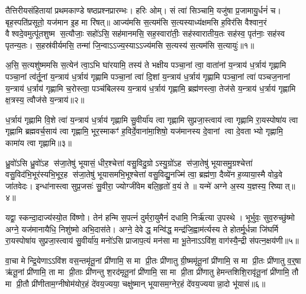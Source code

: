 {}

\setcounter{anuvakam}{0}
तैत्तिरीयसंहितायां प्रथमकाण्डे षष्ठप्रश्नप्रारम्भः। हरिः ओम्। सं त्वा॑ सिञ्चामि॒ यजु॑षा प्र॒जामायु॒र्धनं॑ च। बृह॒स्पति॑प्रसूतो॒ यज॑मान इ॒ह मा रि॑षत्॥ आज्य॑मसि स॒त्यम॑सि स॒त्यस्याध्य॑क्षमसि ह॒विर॑सि वैश्वान॒रं वैश्वदे॒वमुत्पू॑तशुष्म स॒त्यौजाः॒ सहो॑ऽसि॒ सह॑मानमसि॒ सह॒स्वारा॑तीः॒ सह॑स्वारातीय॒तः सह॑स्व॒ पृत॑नाः॒ सह॑स्व पृतन्य॒तः। स॒हस्र॑वीर्यमसि॒ तन्मा॑ जि॒न्वाऽऽज्य॒स्याऽऽज्य॑मसि स॒त्यस्य॑ स॒त्यम॑सि स॒त्यायुः॑॥१॥

अ॒सि॒ स॒त्यशु॑ष्ममसि स॒त्येन॑ त्वा॒ऽभि घा॑रयामि॒ तस्य॑ ते भक्षीय पञ्चा॒नां त्वा॒ वाता॑नां य॒न्त्राय॑ ध॒र्त्राय॑ गृह्णामि पञ्चा॒नां त्व॑र्तू॒नां य॒न्त्राय॑ ध॒र्त्राय॑ गृह्णामि पञ्चा॒नां त्वा॑ दि॒शां य॒न्त्राय॑ ध॒र्त्राय॑ गृह्णामि पञ्चा॒नां त्वा॑ पञ्चज॒नानां य॒न्त्राय॑ ध॒र्त्राय॑ गृह्णामि च॒रोस्त्वा॒ पञ्च॑बिलस्य य॒न्त्राय॑ ध॒र्त्राय॑ गृह्णामि॒ ब्रह्म॑णस्त्वा॒ तेज॑से य॒न्त्राय॑ ध॒र्त्राय॑ गृह्णामि क्ष॒त्रस्य॒ त्वौज॑से य॒न्त्राय॑॥२॥

ध॒र्त्राय॑ गृह्णामि वि॒शे त्वा॑ य॒न्त्राय॑ ध॒र्त्राय॑ गृह्णामि सु॒वीर्या॑य त्वा गृह्णामि सुप्रजा॒स्त्वाय॑ त्वा गृह्णामि रा॒यस्पोषा॑य त्वा गृह्णामि ब्रह्मवर्च॒साय॑ त्वा गृह्णामि॒ भूर॒स्माकꣳ॑ ह॒विर्दे॒वाना॑मा॒शिषो॒ यज॑मानस्य दे॒वानां त्वा दे॒वताभ्यो गृह्णामि॒ कामा॑य त्वा गृह्णामि॥३॥

{\anuvakamend[{स॒त्यायु॒रोज॑से य॒न्त्राय॒ त्रय॑स्त्रिशच्च॥१॥}]}

ध्रु॒वो॑ऽसि ध्रु॒वो॑ऽह स॑जा॒तेषु॑ भूयासं॒ धीर॒श्चेत्ता॑ वसु॒विदु॒ग्रोऽस्यु॒ग्रो॑ऽह स॑जा॒तेषु॑ भूयासमु॒ग्रश्चेत्ता॑ वसु॒विद॑भि॒भूर॑स्यभि॒भूर॒ह स॑जा॒तेषु॑ भूयासमभि॒भूश्चेत्ता॑ वसु॒विद्यु॒नज्मि॑ त्वा॒ ब्रह्म॑णा॒ दैव्ये॑न ह॒व्याया॒स्मै वोढ॒वे जा॑तवेदः। इन्धा॑नास्त्वा सुप्र॒जसः॑ सु॒वीरा॒ ज्योग्जी॑वेम बलि॒हृतो॑ व॒यं ते॥ यन्मे॑ अग्ने अ॒स्य य॒ज्ञस्य॒ रिष्यात्॥४॥

यद्वा॒ स्कन्दा॒दाज्य॑स्यो॒त वि॑ष्णो। तेन॑ हन्मि स॒पत्नं॑ दुर्मरा॒युमैनं॑ दधामि॒ निर्\mbox{}ऋ॑त्या उ॒पस्थे। भूर्भुवः॒ सुव॒रुच्छु॑ष्मो अग्ने॒ यज॑मानायैधि॒ निशु॑ष्मो अभि॒दास॑ते। अग्ने॒ देवेद्ध॒ मन्वि॑द्ध॒ मन्द्र॑जि॒ह्वाम॑र्त्यस्य ते होतर्मू॒र्धन्ना जि॑घर्मि रा॒यस्पोषा॑य सुप्रजा॒स्त्वाय॑ सु॒वीर्या॑य॒ मनो॑ऽसि प्राजाप॒त्यं मन॑सा मा भू॒तेनाऽऽवि॑श॒ वाग॑स्यै॒न्द्री स॑पत्न॒क्षय॑णी॥५॥

वा॒चा मेन्द्रि॒येणाऽऽवि॑श वस॒न्तमृ॑तू॒नां प्री॑णामि॒ स मा प्री॒तः प्री॑णातु ग्री॒ष्ममृ॑तू॒नां प्री॑णामि॒ स मा प्री॒तः प्री॑णातु व॒र्॒\mbox{}षा ऋ॑तू॒नां प्री॑णामि॒ ता मा प्री॒ताः प्री॑णन्तु श॒रद॑मृतू॒नां प्री॑णामि॒ सा मा प्री॒ता प्री॑णातु हेमन्तशिशि॒रावृ॑तू॒नां प्री॑णामि॒ तौ मा प्री॒तौ प्री॑णीताम॒ग्नीषोम॑योर॒हं दे॑वय॒ज्यया॒ चक्षु॑ष्मान् भूयासम॒ग्नेर॒हं दे॑वय॒ज्ययान्ना॒दो भू॑यासं॥६॥

